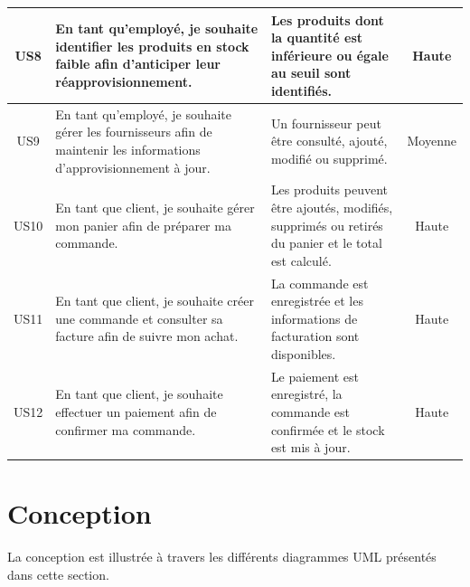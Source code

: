 \begin{longtable}{|c|>{\RaggedRight\arraybackslash}p{5cm}|>{\RaggedRight\arraybackslash}p{5cm}|c|}
US8 &
En tant qu'employé, je souhaite identifier les produits en stock faible afin d'anticiper leur réapprovisionnement. &
Les produits dont la quantité est inférieure ou égale au seuil sont identifiés. &
Haute
\\
\hline


US9 &
En tant qu'employé, je souhaite gérer les fournisseurs afin de maintenir les informations d'approvisionnement à jour. &
Un fournisseur peut être consulté, ajouté, modifié ou supprimé. &
Moyenne
\\
\hline


US10 &
En tant que client, je souhaite gérer mon panier afin de préparer ma commande. &
Les produits peuvent être ajoutés, modifiés, supprimés ou retirés du panier et le total est calculé. &
Haute
\\
\hline


US11 &
En tant que client, je souhaite créer une commande et consulter sa facture afin de suivre mon achat. &
La commande est enregistrée et les informations de facturation sont disponibles. &
Haute
\\
\hline


US12 &
En tant que client, je souhaite effectuer un paiement afin de confirmer ma commande. &
Le paiement est enregistré, la commande est confirmée et le stock est mis à jour. &
Haute
\\
\hline




\end{longtable}

\section{Conception}

La conception est illustrée à travers les différents diagrammes UML présentés dans cette section.

